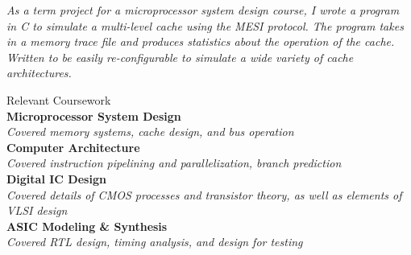 \documentclass{article}
\newcommand\rightcolwidthvar{0.60}
\begin{document}
\begin{minipage}[t]{\rightcolwidthvar \textwidth}
\begin{flushleft}
\textsf{\textit{%
As a term project for a microprocessor system design course, I wrote a program in C to simulate a multi-level cache using the MESI protocol.  The program takes in a memory trace file and produces statistics about the operation of the cache.  Written to be easily re-configurable to simulate a wide variety of cache architectures.\\}}
\end{flushleft}
%
%
\begin{flushleft}
	\textsf{\Large Relevant Coursework}\\
	\medskip
	\textbf{Microprocessor System Design\\}
	\textsf{\textit{Covered memory systems, cache design, and bus operation\\}}\vspace{2pt}
	\textbf{Computer Architecture\\}
	\textsf{\textit{Covered instruction pipelining and parallelization, branch prediction\\}}\vspace{2pt}
	\textbf{Digital IC Design\\}
	\textsf{\textit{Covered details of CMOS processes and transistor theory, as well as elements of VLSI design\\}}\vspace{2pt}
	\textbf{ASIC Modeling \& Synthesis\\}
	\textsf{\textit{Covered RTL design, timing analysis, and design for testing\\}}\vspace{2pt}
\end{flushleft}
\end{minipage}

\bigskip
\end{document}
